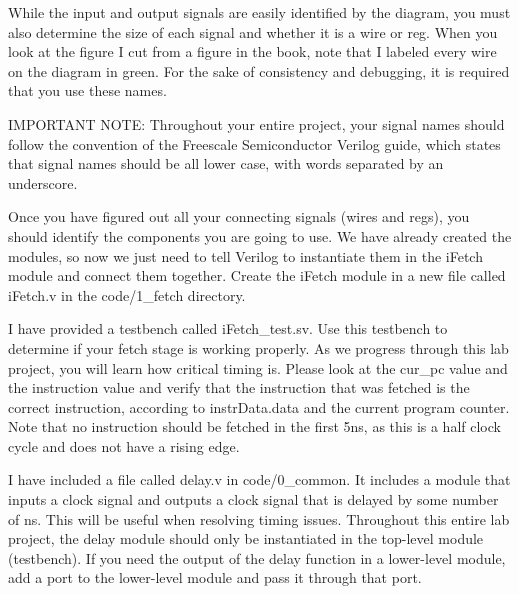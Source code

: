 While the input and output signals are easily identified by the diagram, you must also determine the size of each signal and whether it is a wire or reg.  When you look at the figure I cut from a figure in the book, note that I labeled every wire on the diagram in green.  For the sake of consistency and debugging, it is required that you use these names.  

IMPORTANT NOTE: Throughout your entire project, your signal names should follow the convention of the Freescale Semiconductor Verilog guide, which states that signal names should be all lower case, with words separated by an underscore.   

Once you have figured out all your connecting signals (wires and regs), you should identify the components you are going to use.  We have already created the modules, so now we just need to tell Verilog to instantiate them in the iFetch module and connect them together.  Create the iFetch module in a new file called iFetch.v in the code/1\_fetch directory.  

I have provided a testbench called iFetch\_test.sv.  Use this testbench to determine if your fetch stage is working properly.  As we progress through this lab project, you will learn how critical timing is.  Please look at the cur\_pc value and the instruction value and verify that the instruction that was fetched is the correct instruction, according to instrData.data and the current program counter.  Note that no instruction should be fetched in the first 5ns, as this is a half clock cycle and does not have a rising edge.  

I have included a file called delay.v in code/0\_common.  It includes a module that inputs a clock signal and outputs a clock signal that is delayed by some number of ns.  This will be useful when resolving timing issues.  Throughout this entire lab project, the delay module should only be instantiated in the top-level module (testbench).  If you need the output of the delay function in a lower-level module, add a port to the lower-level module and pass it through that port.


